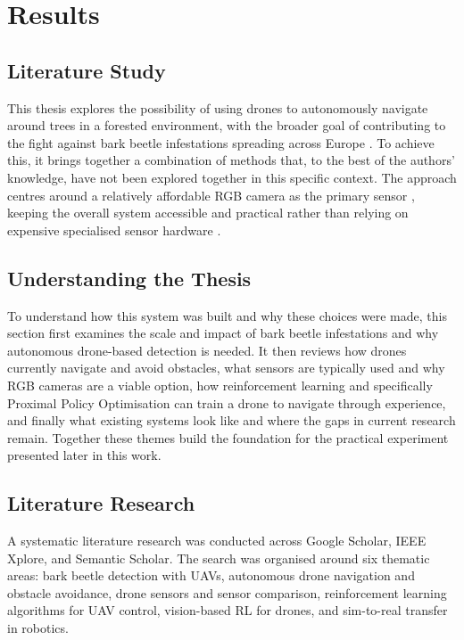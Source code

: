 \documentclass[../main.tex]{subfiles}
\begin{document}
\section{Results}
\justify

\subsection{Literature Study}

This thesis explores the possibility of using drones to autonomously navigate around trees in a forested environment, with the broader goal of contributing to the fight against bark beetle infestations spreading across Europe \cite{Klousek2019,Bozzini2024,Bijou2025}. To achieve this, it brings together a combination of methods that, to the best of the authors' knowledge, have not been explored together in this specific context. The approach centres around a relatively affordable RGB camera as the primary sensor \cite{Kumar2023,Kalidas2023,Kabas2022}, keeping the overall system accessible and practical rather than relying on expensive specialised sensor hardware \cite{Butt2024,Hrabar2012}.

\subsection{Understanding the Thesis}

To understand how this system was built and why these choices were made, this section first examines the scale and impact of bark beetle infestations and why autonomous drone-based detection is needed. It then reviews how drones currently navigate and avoid obstacles, what sensors are typically used and why RGB cameras are a viable option, how reinforcement learning and specifically Proximal Policy Optimisation can train a drone to navigate through experience, and finally what existing systems look like and where the gaps in current research remain. Together these themes build the foundation for the practical experiment presented later in this work.

\subsection{Literature Research}

A systematic literature research was conducted across Google Scholar, IEEE Xplore, and Semantic Scholar. The search was organised around six thematic areas: bark beetle detection with UAVs, autonomous drone navigation and obstacle avoidance, drone sensors and sensor comparison, reinforcement learning algorithms for UAV control, vision-based RL for drones, and sim-to-real transfer in robotics.
\end{document}
